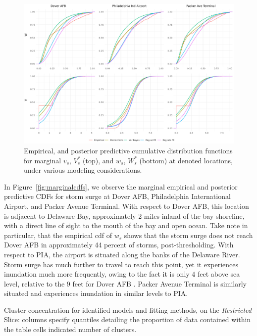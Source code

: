 \begin{figure}[ht]
    \centering
    \includegraphics[width=0.95\linewidth]{./plots/delaware_marginal_cdfs.png}
    \caption{Empirical, and posterior predictive cumulative distribution functions for
        marginal $v_s$, $V_s^*$ (top), and $w_s$, $W_s^*$ (bottom) at denoted locations, under
        various modeling considerations.\label{plot:marginalcdfs}}
\end{figure}

In Figure~\ref{fig:marginalcdfs}, we observe the marginal empirical and posterior predictive
    CDFs for storm surge at Dover AFB, Philadelphia International Airport, and Packer Avenue Terminal.
    With respect to Dover AFB, this location is adjacent to Delaware Bay, approximately 2 miles inland
    of the bay shoreline, with a direct line of sight to the mouth of the bay and open ocean.  Take
    note in particular, that the empirical cdf of $w_s$ shows that the storm surge does not reach
    Dover AFB in approximately \num{44} percent of storms, post-thresholding.  With respect to PIA,
    the airport is situated along the banks of the Delaware River.  Storm surge has much further to
    travel to reach this point, yet it experiences inundation much more frequently, owing to the fact
    it is only 4 feet above sea level, relative to the 9 feet for Dover AFB \makenote{[Confirm]}.  
    Packer Avenue Terminal is similarly situated and experiences inundation in similar levels to PIA.

\begin{table}[ht]
\centering
\caption{Cluster concentration for identified models and fitting 
        methods, on the \emph{Restricted} Slice: columns specify quantiles 
        detailing the proportion of data contained within the table cells 
        indicated number of clusters.\label{tab:cluster_concentration}} 

\end{table}

